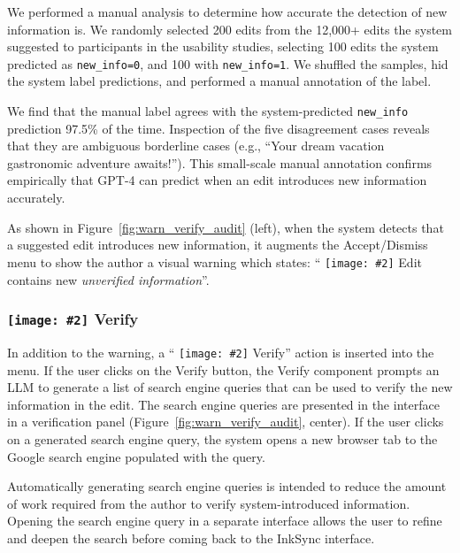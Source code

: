 \documentclass[manuscript]{acmart}
\newcommand{\symbolimg}[2][0.4cm]{%
  \texttt{[image: \#2]}%
}
\begin{document}
We performed a manual analysis to determine how accurate the detection of new information is. We randomly selected 200 edits from the 12,000+ edits the system suggested to participants in the usability studies, selecting 100 edits the system predicted as \texttt{new\_info=0}, and 100 with \texttt{new\_info=1}. We shuffled the samples, hid the system label predictions, and performed a manual annotation of the label.

We find that the manual label agrees with the system-predicted \texttt{new\_info} prediction 97.5\% of the time. Inspection of the five disagreement cases reveals that they are ambiguous borderline cases (e.g., ``Your \textcolor{colordel}{dream vacation} \textcolor{colorins}{gastronomic adventure} awaits!''). This small-scale manual annotation confirms empirically that GPT-4 can predict when an edit introduces new information accurately.

As shown in Figure~\ref{fig:warn_verify_audit} (left), when the system detects that a suggested edit introduces new information, it augments the Accept/Dismiss menu to show the author a visual warning which states: ``\symbolimg[0.3cm]{figures/icons/warn.png} Edit contains new \textit{unverified information}''.

\subsubsection{\symbolimg{figures/icons/verify.png} Verify} \label{sec:verify} 

In addition to the warning, a ``\symbolimg[0.3cm]{figures/icons/verify.png} Verify'' action is inserted into the menu. If the user clicks on the Verify button, the Verify component prompts an LLM to generate a list of search engine queries that can be used to verify the new information in the edit. The search engine queries are presented in the interface in a verification panel (Figure~\ref{fig:warn_verify_audit}, center). If the user clicks on a generated search engine query, the system opens a new browser tab to the Google search engine populated with the query.

Automatically generating search engine queries is intended to reduce the amount of work required from the author to verify system-introduced information. Opening the search engine query in a separate interface allows the user to refine and deepen the search before coming back to the InkSync interface.
\end{document}
